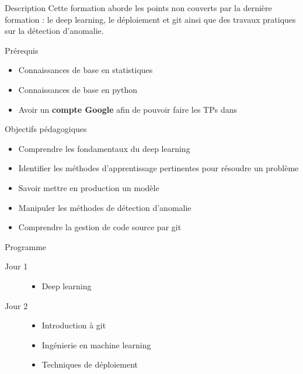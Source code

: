 
\begin{frame}{Description}
  Cette formation aborde les points non couverts par la dernière formation : le deep learning, le déploiement et git ainsi que des travaux pratiques sur la détection d'anomalie.
\end{frame}

\begin{frame}{Prérequis}
  \begin{itemize}
  \item Connaissances de base en statistiques
  \item Connaissances de base en python
  \item Avoir un \textbf{compte Google} afin de pouvoir faire les TPs dans 
  \end{itemize}
\end{frame}

\begin{frame}{Objectifs pédagogiques}
  \begin{itemize}
  \item Comprendre les fondamentaux du deep learning
  \item Identifier les méthodes d'apprentissage pertinentes pour résoudre un problème
  \item Savoir mettre en production un modèle
  \item Manipuler les méthodes de détection d'anomalie
  \item Comprendre la gestion de code source par git
  \end{itemize}
\end{frame}

\begin{frame}{Programme}

  \begin{description}
    \item[Jour 1]
      \begin{itemize}
        \item Deep learning
      \end{itemize}
    \item[Jour 2]
      \begin{itemize}
        \item Introduction à git
        \item Ingénierie en machine learning
        \item Techniques de déploiement
      \end{itemize}
  \end{description}
\end{frame}
